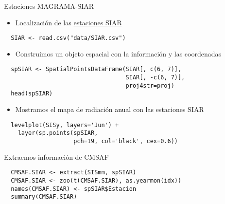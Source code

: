 \documentclass[xcolor={usenames,svgnames,dvipsnames}]{beamer}
\begin{document}
\begin{frame}[fragile,label=sec-4-1]{Estaciones MAGRAMA-SIAR}
 \begin{itemize}
\item Localización de las \href{https://raw.github.com/oscarperpinan/intro/master/data/SIAR.csv}{estaciones SIAR}
\end{itemize}
\lstset{language=R,label= ,caption= ,numbers=none}
\begin{lstlisting}
  SIAR <- read.csv("data/SIAR.csv")
\end{lstlisting}
\begin{itemize}
\item Construimos un objeto espacial con la información y las coordenadas
\end{itemize}
\lstset{language=R,label= ,caption= ,numbers=none}
\begin{lstlisting}
  spSIAR <- SpatialPointsDataFrame(SIAR[, c(6, 7)],
                                   SIAR[, -c(6, 7)],
                                   proj4str=proj)
  head(spSIAR)
\end{lstlisting}
\begin{itemize}
\item Mostramos el mapa de radiación anual con las estaciones SIAR
\end{itemize}
\lstset{language=R,label= ,caption= ,numbers=none}
\begin{lstlisting}
  levelplot(SISy, layers='Jun') +
    layer(sp.points(spSIAR,
                    pch=19, col='black', cex=0.6))
\end{lstlisting}
\end{frame}

\begin{frame}[fragile,label=sec-4-2]{Extraemos información de CMSAF}
 \lstset{language=R,label= ,caption= ,numbers=none}
\begin{lstlisting}
  CMSAF.SIAR <- extract(SISmm, spSIAR)
  CMSAF.SIAR <- zoo(t(CMSAF.SIAR), as.yearmon(idx))
  names(CMSAF.SIAR) <- spSIAR$Estacion
  summary(CMSAF.SIAR)
\end{lstlisting}
\end{frame}
\end{document}
